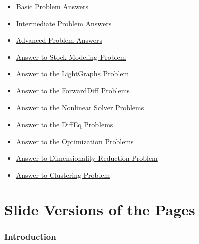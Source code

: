 \documentclass[11pt]{article}
\begin{document}
\begin{itemize}
\itemsep1pt\parskip0pt
\item
  \href{http://ucidatascienceinitiative.github.io/IntroToJulia/Html/BasicProblemAnswers}{Basic
  Problem Answers}
\item
  \href{http://ucidatascienceinitiative.github.io/IntroToJulia/Html/IntermediateProblemAnswers}{Intermediate
  Problem Answers}
\item
  \href{http://ucidatascienceinitiative.github.io/IntroToJulia/Html/AdvancedProblemAnswers}{Advanced
  Problem Answers}
\item
  \href{http://ucidatascienceinitiative.github.io/IntroToJulia/Html/StockProblemAnswers}{Answer
  to Stock Modeling Problem}
\item
  \href{http://ucidatascienceinitiative.github.io/IntroToJulia/Html/LightGraphsAnswers}{Answer
  to the LightGraphs Problem}
\item
  \href{http://ucidatascienceinitiative.github.io/IntroToJulia/Html/ForwardDiffAnswers}{Answer
  to the ForwardDiff Problems}
\item
  \href{http://ucidatascienceinitiative.github.io/IntroToJulia/Html/NonlinearSolveAnswers}{Answer
  to the Nonlinear Solver Problems}
\item
  \href{http://ucidatascienceinitiative.github.io/IntroToJulia/Html/DiffEqSolutions}{Answer
  to the DiffEq Problems}
\item
  \href{http://ucidatascienceinitiative.github.io/IntroToJulia/Html/OptimizationAnswers}{Answer
  to the Optimization Problems}
\item
  \href{http://ucidatascienceinitiative.github.io/IntroToJulia/Html/DimensionalityReductionSolutions}{Answer
  to Dimensionality Reduction Problem}
\item
  \href{http://ucidatascienceinitiative.github.io/IntroToJulia/Html/ClusteringSolutions}{Answer
  to Clustering Problem}
\end{itemize}

    \section{Slide Versions of the Pages}\label{slide-versions-of-the-pages}

\subsubsection{Introduction}\label{introduction}
\end{document}
